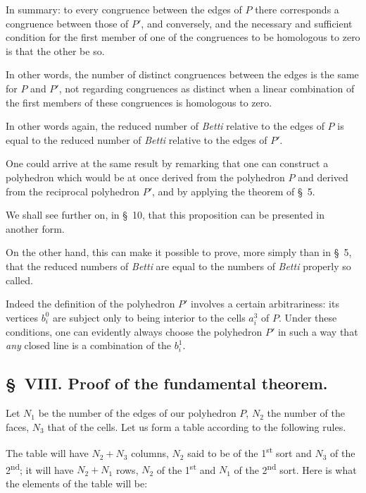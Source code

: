 \documentclass{article}
\begin{document}
In summary: to every congruence between the edges of $P$ there corresponds a congruence between those of $P'$, and conversely, and the necessary and sufficient condition for the first member of one of the congruences to be homologous to zero is that the other be so.

In other words, the number of distinct congruences between the edges is the same for $P$ and $P'$, not regarding congruences as distinct when a linear combination of the first members of these congruences is homologous to zero.

In other words again, the reduced number of \emph{Betti} relative to the edges of $P$ is equal to the reduced number of \emph{Betti} relative to the edges of $P'$.

One could arrive at the same result by remarking that one can construct a polyhedron which would be at once derived from the polyhedron $P$ and derived from the reciprocal polyhedron $P'$, and by applying the theorem of \S~5.

We shall see further on, in \S~10, that this proposition can be presented in another form.

On the other hand, this can make it possible to prove, more simply than in \S~5, that the reduced numbers of \emph{Betti} are equal to the numbers of \emph{Betti} properly so called.

Indeed the definition of the polyhedron $P'$ involves a certain arbitrariness: its vertices $b^{0}_{i}$ are subject only to being interior to the cells $a^{3}_{i}$ of $P$. Under these conditions, one can evidently always choose the polyhedron $P'$ in such a way that \emph{any} closed line is a combination of the $b^{1}_{i}$.

\subsection*{\S~VIII. Proof of the fundamental theorem.}

Let $N_{1}$ be the number of the edges of our polyhedron $P$, $N_{2}$ the number of the faces, $N_{3}$ that of the cells. Let us form a table according to the following rules.


The table will have $N_{2} + N_{3}$ columns, $N_{2}$ said to be of the 1\textsuperscript{st} sort and $N_{3}$ of the 2\textsuperscript{nd}; it will have $N_{2} + N_{1}$ rows, $N_{2}$ of the 1\textsuperscript{st} and $N_{1}$ of the 2\textsuperscript{nd} sort. Here is what the elements of the table will be:
\end{document}
